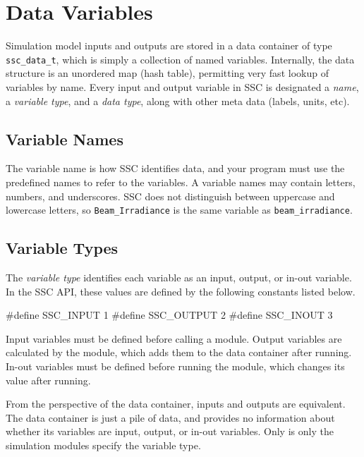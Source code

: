 \documentclass{scrartcl} %
\begin{document}
\section{Data Variables}
\label{sec_variables}

Simulation model inputs and outputs are stored in a data container of type \texttt{ssc\_data\_t}, which is simply a collection of named variables.  Internally, the data structure is an unordered map (hash table), permitting very fast lookup of variables by name.  Every input and output variable in SSC is designated a \emph{name}, a \emph{variable type}, and a \emph{data type}, along with other meta data (labels, units, etc). 

\subsection{Variable Names}

The variable name is how SSC identifies data, and your program must use the predefined names to refer to the variables. A variable names may contain letters, numbers, and underscores. SSC does not distinguish between uppercase and lowercase letters, so \texttt{Beam\_Irradiance} is the same variable as \texttt{beam\_irradiance}.

\subsection{Variable Types}

The \emph{variable type} identifies each variable as an input, output, or in-out variable.  In the SSC API, these values are defined by the following constants listed below.

\begin{verbatimtab}
#define SSC_INPUT 1
#define SSC_OUTPUT 2
#define SSC_INOUT 3
\end{verbatimtab}

Input variables must be defined before calling a module. Output variables are calculated by the module, which adds them to the data container after running. In-out variables must be defined before running the module, which changes its value after running.

From the perspective of the data container, inputs and outputs are equivalent. The data container is just a pile of data, and provides no information about whether its variables are input, output, or in-out variables. Only is only the simulation modules specify the variable type.
\end{document}
